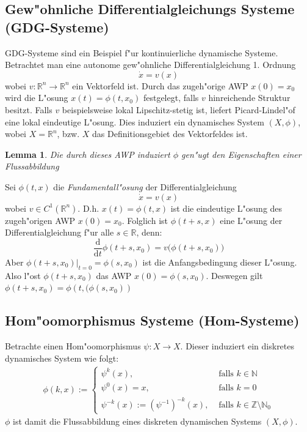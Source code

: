 \documentclass[a4paper, 13pt]{scrreprt}
\newtheorem{lemma}[theorem]{Lemma}
\theoremstyle{definition} \newtheorem{definition}{Definition}[section]
\newenvironment{beweis}[1][Beweis]{\begin{trivlist}
\item[\hskip \labelsep {\bfseries #1}]}{\end{trivlist}}
\begin{document}
\subsection{Gew"ohnliche Differentialgleichungs Systeme (GDG-Systeme)}
GDG-Systeme sind ein Beispiel f"ur kontinuierliche dynamische Systeme. Betrachtet man eine autonome gew"ohnliche Differentialgleichung 1. Ordnung
$$\dot x= v(x)$$
wobei $v\colon\mathbb{R}^n\to\mathbb{R}^n$ ein Vektorfeld ist. Durch das zugeh"orige AWP $x(0) = x_0$ wird die L"osung $x(t) = \phi(t, x_0)$ festgelegt, falls $v$ hinreichende Struktur besitzt. Falls $v$ beispielsweise lokal Lipschitz-stetig ist, liefert Picard-Lindel"of eine lokal eindeutige L"osung. 
Dies induziert ein dynamisches System $(X, \phi)$, wobei $X = \mathbb{R}^n$, bzw. $X$ das Definitionsgebiet des Vektorfeldes ist.
\begin{lemma}
Die durch dieses AWP induziert $\phi$ gen"ugt den Eigenschaften einer Flussabbildung
\end{lemma}
\begin{beweis}
Sei $\phi(t, x)$ die \emph{Fundamentall"osung} der Differentialgleichung
$$\dot x = v(x)$$
wobei $v\in C^1(\mathbb{R}^n)$. D.h. $x(t) = \phi(t,x)$ ist die eindeutige L"osung des zugeh"origen AWP $x(0) = x_0$.
Folglich ist $\phi(t+s, x)$ eine L"osung der Differentialgleichung f"ur alle $s\in \mathbb{R}$, denn:
$$\frac{\mathrm d}{\mathrm dt} \phi(t+s, x_0) = v\bigl(\phi(t+s, x_0)\bigr)$$
Aber $\left . \phi(t+s, x_0) \right |_{t=0} = \phi(s, x_0)$ ist die Anfangsbedingung dieser L"osung. Also l"ost $\phi(t+s, x_0)$ das AWP $x(0) = \phi(s, x_0)$.
Deswegen gilt $\phi(t+s, x_0) = \phi\left(t, (\phi(s, x_0)\right)$
\end{beweis}

\subsection{Hom"oomorphismus Systeme (Hom-Systeme)}
Betrachte einen Hom"oomorphismus $\psi\colon X \to X$. Dieser induziert ein diskretes dynamisches System wie folgt:
\begin{align*}
\phi(k, x) := \begin{cases}
\psi^k(x), &\mbox{ falls } k \in \mathbb{N} \\
\psi^0(x) = x,& \mbox{ falls } k = 0 \\
\psi^{-k}(x) := (\psi^{-1})^{-k}(x), &\mbox{ falls } k \in \mathbb{Z}\setminus\mathbb{N}_0
\end{cases}
\end{align*}
$\phi$ ist damit die Flussabbildung eines diskreten dynamischen Systems $(X, \phi)$.
\end{document}
